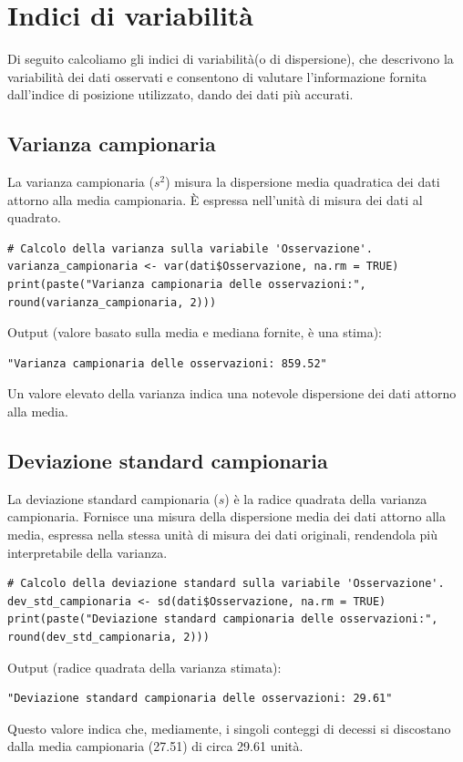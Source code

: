 \documentclass[14pt, openany, titlepage]{report} %
\begin{document}
\chapter{Indici di variabilità} 
Di seguito calcoliamo gli indici di variabilità(o di dispersione), che descrivono la 
variabilità dei dati osservati e consentono di valutare l'informazione 
fornita dall'indice di posizione utilizzato, dando dei dati più accurati.

\section{Varianza campionaria}
La varianza campionaria ($s^2$) misura la dispersione
 media quadratica dei dati attorno alla media campionaria.
  È espressa nell'unità di misura dei dati al quadrato.
\begin{center}
\begin{lstlisting}[breaklines=true]
# Calcolo della varianza sulla variabile 'Osservazione'.
varianza_campionaria <- var(dati$Osservazione, na.rm = TRUE)
print(paste("Varianza campionaria delle osservazioni:", round(varianza_campionaria, 2)))
\end{lstlisting}
\end{center}
\noindent
Output (valore basato sulla media e mediana fornite, è una stima):
\begin{verbatim}
"Varianza campionaria delle osservazioni: 859.52" 
\end{verbatim}
Un valore elevato della varianza indica una notevole
 dispersione dei dati attorno alla media.
    
\section{Deviazione standard campionaria}
La deviazione standard campionaria ($s$) è la radice quadrata 
della varianza campionaria. Fornisce una misura della dispersione
 media dei dati attorno alla media, espressa nella stessa unità 
 di misura dei dati originali, rendendola più interpretabile 
 della varianza.
\begin{center}
\begin{lstlisting}[breaklines=true]
# Calcolo della deviazione standard sulla variabile 'Osservazione'.
dev_std_campionaria <- sd(dati$Osservazione, na.rm = TRUE)
print(paste("Deviazione standard campionaria delle osservazioni:", round(dev_std_campionaria, 2)))
\end{lstlisting}
\end{center}
\noindent
Output (radice quadrata della varianza stimata):
\begin{verbatim}
"Deviazione standard campionaria delle osservazioni: 29.61"
\end{verbatim}
Questo valore indica che, mediamente, i singoli conteggi di 
decessi si discostano dalla media campionaria (27.51) di 
circa 29.61 unità.
    
\end{document}
